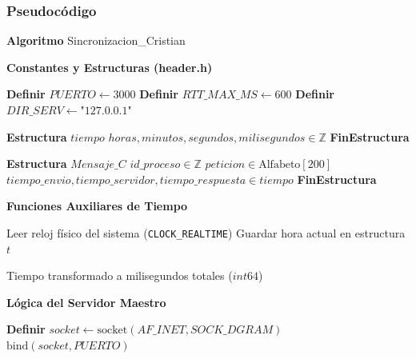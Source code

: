 \subsubsection{Pseudocódigo}

\begin{tcolorbox}[colback=white, colframe=azul_unam, title=Pseudocódigo: sinc\_cristian.c, breakable]

\textbf{Algoritmo} Sincronizacion\_Cristian


\textbf{Constantes y Estructuras (header.h)}

\begin{algorithmic}[1]
\State \textbf{Definir} $PUERTO \gets 3000$
\State \textbf{Definir} $RTT\_MAX\_MS \gets 600$
\State \textbf{Definir} $DIR\_SERV \gets \text{"127.0.0.1"}$

\vspace{0.2cm}
\State \textbf{Estructura} $tiempo$
\State \quad $horas, minutos, segundos, milisegundos \in \mathbb{Z}$
\State \textbf{FinEstructura}

\vspace{0.2cm}
\State \textbf{Estructura} $Mensaje\_C$
\State \quad $id\_proceso \in \mathbb{Z}$
\State \quad $peticion \in \text{Alfabeto}[200]$
\State \quad $tiempo\_envio, tiempo\_servidor, tiempo\_respuesta \in tiempo$
\State \textbf{FinEstructura}
\end{algorithmic}

\vspace{0.3cm}

\textbf{Funciones Auxiliares de Tiempo}
\begin{algorithmic}[1]
    \State Leer reloj físico del sistema (\texttt{CLOCK\_REALTIME})
    \State Guardar hora actual en estructura $t$
\EndProcedure

\Statex
{}
    \State \Return Tiempo transformado a milisegundos totales ($int64$)
\EndProcedure
\end{algorithmic}

\vspace{0.3cm}

\textbf{Lógica del Servidor Maestro}
\begin{algorithmic}[1]
    \State \textbf{Definir} $socket \gets \text{socket}(AF\_INET, SOCK\_DGRAM)$ 
    \State $\text{bind}(socket, PUERTO)$
    

\end{algorithmic}
\end{tcolorbox}
